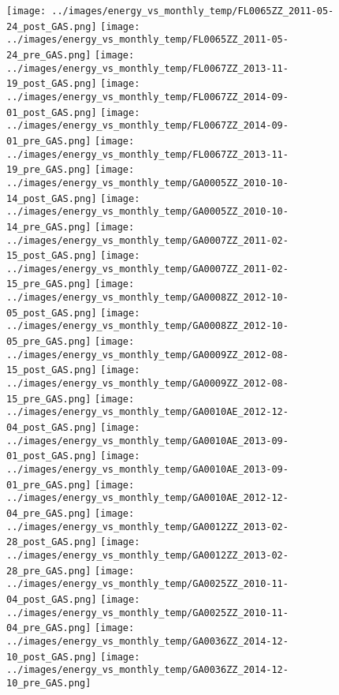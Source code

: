 \clearpage
\begin{figure}
\centering
\texttt{[image: ../images/energy\_vs\_monthly\_temp/FL0065ZZ\_2011-05-24\_post\_GAS.png]}
\texttt{[image: ../images/energy\_vs\_monthly\_temp/FL0065ZZ\_2011-05-24\_pre\_GAS.png]}
\texttt{[image: ../images/energy\_vs\_monthly\_temp/FL0067ZZ\_2013-11-19\_post\_GAS.png]}
\texttt{[image: ../images/energy\_vs\_monthly\_temp/FL0067ZZ\_2014-09-01\_post\_GAS.png]}
\texttt{[image: ../images/energy\_vs\_monthly\_temp/FL0067ZZ\_2014-09-01\_pre\_GAS.png]}
\texttt{[image: ../images/energy\_vs\_monthly\_temp/FL0067ZZ\_2013-11-19\_pre\_GAS.png]}
\texttt{[image: ../images/energy\_vs\_monthly\_temp/GA0005ZZ\_2010-10-14\_post\_GAS.png]}
\texttt{[image: ../images/energy\_vs\_monthly\_temp/GA0005ZZ\_2010-10-14\_pre\_GAS.png]}
\texttt{[image: ../images/energy\_vs\_monthly\_temp/GA0007ZZ\_2011-02-15\_post\_GAS.png]}
\texttt{[image: ../images/energy\_vs\_monthly\_temp/GA0007ZZ\_2011-02-15\_pre\_GAS.png]}
\texttt{[image: ../images/energy\_vs\_monthly\_temp/GA0008ZZ\_2012-10-05\_post\_GAS.png]}
\texttt{[image: ../images/energy\_vs\_monthly\_temp/GA0008ZZ\_2012-10-05\_pre\_GAS.png]}
\texttt{[image: ../images/energy\_vs\_monthly\_temp/GA0009ZZ\_2012-08-15\_post\_GAS.png]}
\texttt{[image: ../images/energy\_vs\_monthly\_temp/GA0009ZZ\_2012-08-15\_pre\_GAS.png]}
\texttt{[image: ../images/energy\_vs\_monthly\_temp/GA0010AE\_2012-12-04\_post\_GAS.png]}
\texttt{[image: ../images/energy\_vs\_monthly\_temp/GA0010AE\_2013-09-01\_post\_GAS.png]}
\texttt{[image: ../images/energy\_vs\_monthly\_temp/GA0010AE\_2013-09-01\_pre\_GAS.png]}
\texttt{[image: ../images/energy\_vs\_monthly\_temp/GA0010AE\_2012-12-04\_pre\_GAS.png]}
\texttt{[image: ../images/energy\_vs\_monthly\_temp/GA0012ZZ\_2013-02-28\_post\_GAS.png]}
\texttt{[image: ../images/energy\_vs\_monthly\_temp/GA0012ZZ\_2013-02-28\_pre\_GAS.png]}
\texttt{[image: ../images/energy\_vs\_monthly\_temp/GA0025ZZ\_2010-11-04\_post\_GAS.png]}
\texttt{[image: ../images/energy\_vs\_monthly\_temp/GA0025ZZ\_2010-11-04\_pre\_GAS.png]}
\texttt{[image: ../images/energy\_vs\_monthly\_temp/GA0036ZZ\_2014-12-10\_post\_GAS.png]}
\texttt{[image: ../images/energy\_vs\_monthly\_temp/GA0036ZZ\_2014-12-10\_pre\_GAS.png]}
\end{figure}
